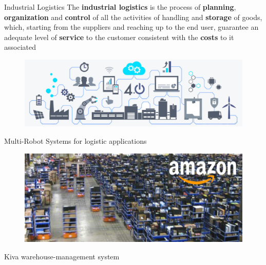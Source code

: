 
    \begin{frame}[fragile]{Industrial Logistics}
        The {\bf industrial logistics} is the process of {\bf planning}, {\bf organization}
        and {\bf control} of all the activities of handling and {\bf storage} of goods, which, starting
        from the suppliers and reaching up to the end user, guarantee an adequate
        level of {\bf service} to the customer consistent with the {\bf costs} to it associated

        \begin{figure}[hbt]
            \centering
            \includegraphics[width=\textwidth]{img/ind4.png}
        \end{figure}
    \end{frame}

    \begin{frame}[fragile]{Multi-Robot Systems for logistic applications}

        \begin{figure}[hbt]
            \centering
            \includegraphics[width=\textwidth]{img/kiva.png}
        \end{figure}
        
        \begin{center}
        Kiva warehouse-management system
        \end{center}
    \end{frame}

